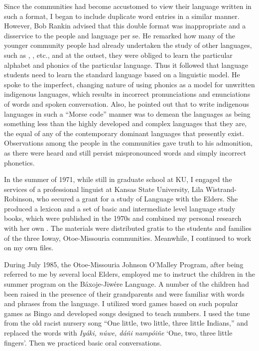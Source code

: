 \documentclass[output=paper]{LSP/langsci}
\begin{document}
Since the communities had become accustomed to view their language written in such a format, I began to include duplicate  word entries in a similar manner. However, Bob Rankin advised that this double format was inappropriate and a disservice to the people and language per se. He remarked how many of the younger community people had already undertaken the study of other languages, such as , , etc., and at the outset, they were obliged to learn the particular alphabet and phonics of the particular language. Thus it followed that language students need to learn the standard language  based on a linguistic model. He spoke to the imperfect, changing nature of using  phonics as a model for unwritten indigenous languages, which results in incorrect pronunciations and enunciations of words and spoken conversation. Also, he pointed out that to write indigenous languages in such a ``Morse code'' manner was to demean the languages as being something less than the highly developed and complex languages that they are, the equal of any of the contemporary dominant languages that presently exist. Observations among the people in the communities gave truth to his admonition, as there were heard and still persist mispronounced words and simply incorrect phonetics. 

In the summer of 1971, while still in graduate school at KU, I engaged the services of a professional linguist at Kansas State University, Lila Wistrand-Robinson, who secured a grant for a study of  Language with the Elders. She produced a lexicon and a set of basic and intermediate level language study books, which were published in the 1970s and combined my personal research with her own \citep{OtoeIowaWistrandRobinson1977,OtoeIowaWistrandRobinson1978}. The materials were distributed gratis to the students and families of the three Ioway, Otoe-Missouria communities. Meanwhile, I continued to work on my own  files.  

During July 1985, the Otoe-Missouria Johnson O'Malley Program, after being referred to me by several local Elders, employed me to instruct the children in the summer program on the Báxoje-Jiwére Language. A number of the children had been raised in the presence of their grandparents and were familiar with words and phrases from the language. I utilized word games based on such popular games as Bingo and developed songs designed to teach numbers. I used the tune from the old racist nursery song ``One little, two little, three little Indians,'' and replaced the words with \emph{Iyáki, núwe, dáñi nampóiñe} `One, two, three little fingers'. Then we practiced basic oral conversations.  
\end{document}
